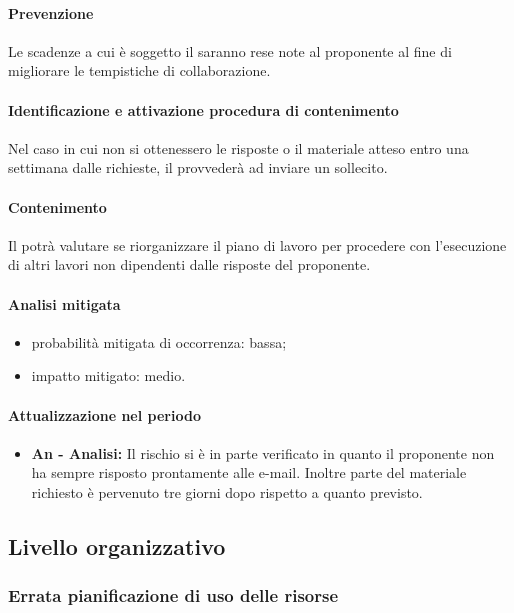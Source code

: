 			\paragraph{Prevenzione} Le scadenze a cui è soggetto il  saranno rese note al proponente al fine di migliorare le tempistiche di collaborazione.
			\paragraph{Identificazione e attivazione procedura di contenimento}
			Nel caso in cui non si ottenessero le risposte o il materiale atteso entro una settimana dalle richieste, il \responsabilediprogetto{} provvederà ad inviare un sollecito.
			\paragraph{Contenimento} Il \responsabilediprogetto{} potrà valutare se riorganizzare il piano di lavoro per procedere con l'esecuzione di altri lavori non dipendenti dalle risposte del proponente.
			\paragraph{Analisi mitigata}
			\begin{itemize}
			\item{probabilità mitigata di occorrenza:} bassa;
			\item{impatto mitigato:} medio.
			\end{itemize}
			\paragraph{Attualizzazione nel periodo}
				\begin{itemize}
				\item \textbf{{An - Analisi}:} Il rischio si è in parte verificato in quanto il proponente non ha sempre risposto prontamente alle e-mail. Inoltre parte del materiale richiesto è pervenuto tre giorni dopo rispetto a quanto previsto.
				\end{itemize}

	\subsection{Livello organizzativo}
		\subsubsection {Errata pianificazione di uso delle risorse}
			\label{subsec:errataPianificazione}
